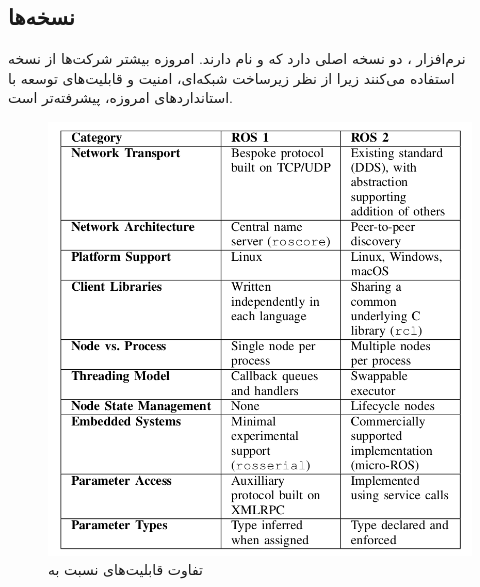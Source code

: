 \subsection{نسخه‌ها}

نرم‌افزار ، دو نسخه اصلی دارد که  و  نام دارند. امروزه بیشتر شرکت‌ها از نسخه  استفاده می‌کنند زیرا از نظر زیرساخت شبکه‌ای، امنیت و قابلیت‌های توسعه با استانداردهای امروزه، پیشرفته‌تر است. 
\begin{figure}[h!]
    \centering
    \includegraphics[width=0.8\linewidth]{figures/ROS1_ROS2_comparison.png}
    \caption{تفاوت قابلیت‌های  نسبت به \cite{doi:10.1126/scirobotics.abm6074}}
    \label{fig:ROS1_ROS2_comparison}
\end{figure}

